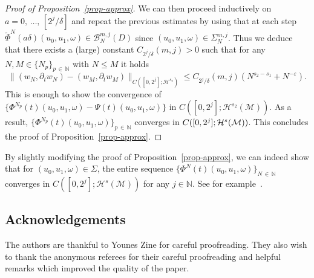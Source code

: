 \documentclass[AHL,Unicode,longabstracts,published]{cedram}
\newcommand{\N}{\mathbb{N}}
\newcommand{\B}{\mathcal{B}}
\newcommand{\M}{\mathcal{M}}
\renewcommand{\H}{\mathcal{H}}
\newcommand{\dl}{\delta}
\newcommand{\eps}{\varepsilon}
\newcommand{\Si}{\Sigma}
\newcommand{\wt}{\widetilde}
\newcommand{\dt}{\partial_t}
\renewcommand{\o}{\omega}
\begin{document}
\begin{proof}[Proof of Proposition~\ref{prop-approx}]
We can then proceed inductively on $a=0,\,\dots,\,[2^j/\dl]$ and repeat the previous estimates by using that at each step $\wt\Phi^N(a\dl)(u_0,u_1,\o)\in\B_N^{m,j}(D)$ since $(u_0,u_1,\o)\in \Si_N^{m,j}$. Thus we deduce that there exists a (large) constant $C_{2^j/\dl}(m,j)>0$ such that for any $N,M \in \{N_p\}_{p\,\in\,\N}$ with $N\le M$ it holds
\begin{equation}
\big\|(w_N, \dt w_N)-(w_M,\dt w_M)\big\|_{C\left([0,2^j];\H^{s_2}\right)} \le C_{2^j/\dl}(m,j)\left(N^{s_2-s_1}+N^{-\eps}\right).
\end{equation}
This is enough to show the convergence of $\{\Phi^{N_p}(t)(u_0,u_1,\o)-\Psi(t)(u_0,u_1,\o)\}$ in $C([0,2^j];\H^{s_2}(\M))$. As a result, $\big\{\Phi^{N_p}(t)(u_0,u_1,\o)\big\}_{p\,\in\,\N}$ converges in $C([0,2^j];\linebreak\H^s(\M))$. This concludes the proof of Proposition~\ref{prop-approx}.
\end{proof}

\begin{rema}
By slightly modifying the proof of Proposition~\ref{prop-approx}, we can indeed show that for $(u_0,u_1,\o)\in\Sigma$, the entire sequence $\big\{\Phi^N(t)(u_0,u_1,\o)\big\}_{N\,\in\,\N}$ converges in $C([0,2^j];\H^s(\M))$ for any $j\in\N$. See for example~\cite[Corollary~9.11]{OOT}.
\end{rema}

\subsection*{Acknowledgements}
The authors are thankful to Younes Zine for careful proofreading. They also wish to thank the anonymous referees for their careful proofreading and helpful remarks which improved the quality of the paper.




\end{document}

